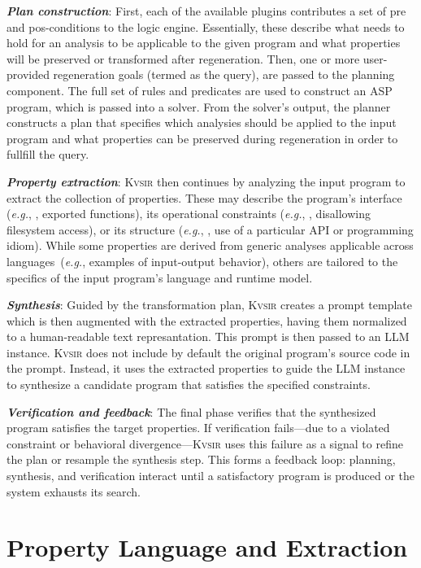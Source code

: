 \documentclass[sigplan]{acmart}
\def\eg{{\em e.g.}, }
\newcommand{\sys}{{\scshape Kv{\textalpha}sir}\xspace}
\newcommand{\heading}[1]{\vspace{2pt}\noindent\textbf{\emph{#1}}:\enspace}
\begin{document}
\heading{Plan construction}
First, each of the available plugins contributes a set of pre and pos-conditions 
to the logic engine.
Essentially, these describe what needs to hold for an analysis to be applicable to the given 
program and what properties will be preserved or transformed after regeneration.
Then, one or more user-provided regeneration goals (termed as the query), are passed to the planning component.
The full set of rules and predicates are used to construct an ASP program,
which is passed into a solver.
From the solver's output, the planner constructs a plan that specifies which
analysies should be applied to the input program and what properties can be
preserved during regeneration in order to fullfill the query.

\heading{Property extraction} \sys then continues by analyzing the input program to
extract the collection of properties.
These may describe the program's interface
(\eg, exported functions), its operational constraints (\eg, disallowing
filesystem access), or its structure (\eg, use of a particular API or programming idiom).
While some properties are derived from generic analyses
applicable across languages~(\eg examples of input-output behavior), others are tailored to the specifics of the input program's language and runtime model.

\heading{Synthesis}
Guided by the transformation plan, \sys creates a prompt template which is then
augmented with the extracted properties, having them normalized to a human-readable text represantation.
This prompt is then passed to an LLM instance.
\sys does not include by default the original program's source code in the prompt.
Instead, it uses the extracted properties to guide the LLM instance 
to synthesize a candidate program that satisfies the specified constraints.

\heading{Verification and feedback}
The final phase verifies that the
synthesized program satisfies the target properties.
If verification fails---due to a violated constraint or behavioral divergence---\sys uses this
failure as a signal to refine the plan or resample the synthesis step.
This forms a feedback loop: planning, synthesis, and verification interact until a
satisfactory program is produced or the system exhausts its search.

\section{Property Language and Extraction}
\label{sec:dsl}
\end{document}
